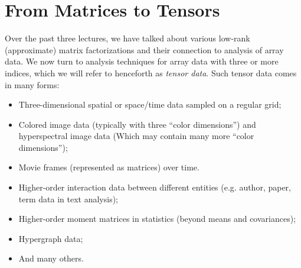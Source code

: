\documentclass[12pt, leqno]{article} %
\begin{document}




\section{From Matrices to Tensors}

Over the past three lectures, we have talked about various low-rank
(approximate) matrix factorizations and their connection to analysis
of array data.  We now turn to analysis techniques for array data
with three or more indices, which we will refer to henceforth as
{\em tensor data}.  Such tensor data comes in many forms:
\begin{itemize}
\item Three-dimensional spatial or space/time data sampled on a
  regular grid;
\item Colored image data (typically with three ``color dimensions'')
  and hyperspectral image data (Which may contain many more ``color
  dimensions'');
\item Movie frames (represented as matrices) over time.
\item Higher-order interaction data between different entities
  (e.g. author, paper, term data in text analysis);
\item Higher-order moment matrices in statistics (beyond means and covariances);
\item Hypergraph data;
\item And many others.
\end{itemize}
\end{document}
